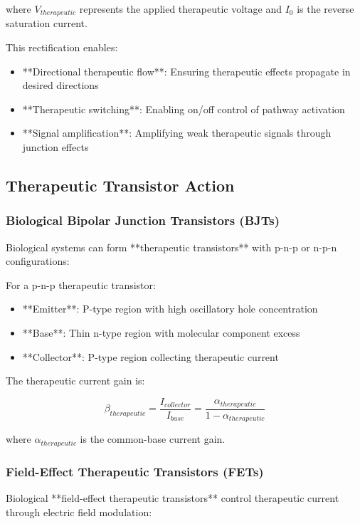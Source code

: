 \documentclass[12pt,a4paper]{article}
\begin{document}
where $V_{therapeutic}$ represents the applied therapeutic voltage and $I_0$ is the reverse saturation current.

This rectification enables:
\begin{itemize}
\item **Directional therapeutic flow**: Ensuring therapeutic effects propagate in desired directions
\item **Therapeutic switching**: Enabling on/off control of pathway activation
\item **Signal amplification**: Amplifying weak therapeutic signals through junction effects
\end{itemize}

\subsection{Therapeutic Transistor Action}

\subsubsection{Biological Bipolar Junction Transistors (BJTs)}

Biological systems can form **therapeutic transistors** with p-n-p or n-p-n configurations:

For a p-n-p therapeutic transistor:
\begin{itemize}
\item **Emitter**: P-type region with high oscillatory hole concentration
\item **Base**: Thin n-type region with molecular component excess
\item **Collector**: P-type region collecting therapeutic current
\end{itemize}

The therapeutic current gain is:

\begin{equation}
\beta_{therapeutic} = \frac{I_{collector}}{I_{base}} = \frac{\alpha_{therapeutic}}{1 - \alpha_{therapeutic}}
\end{equation}

where $\alpha_{therapeutic}$ is the common-base current gain.

\subsubsection{Field-Effect Therapeutic Transistors (FETs)}

Biological **field-effect therapeutic transistors** control therapeutic current through electric field modulation:
\end{document}
